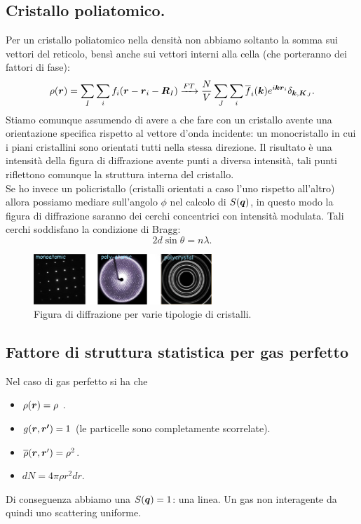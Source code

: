\subsection{Cristallo poliatomico.}
\label{subsec:Cristallo poliatomico.}
Per un cristallo poliatomico nella densità non abbiamo soltanto la somma sui vettori del reticolo, bensì anche sui vettori interni alla cella (che porteranno dei fattori di fase):
\[
	\rho (\boldsymbol{r}) 
	=
	\sum_{I}^{} \sum_{i}^{} f_i(\boldsymbol{r}-\boldsymbol{r}_i - \boldsymbol{R}_I)
	\xrightarrow[]{FT}
	\frac{N}{V} \sum_{J}^{} \sum_{i}^{} 
	\overline{f}_i(\boldsymbol{k}) e^{i \boldsymbol{k}\boldsymbol{r}_i}\delta_{\boldsymbol{k},\boldsymbol{K}_J}
.\] 
Stiamo comunque assumendo di avere a che fare con un cristallo avente una orientazione specifica rispetto al vettore d'onda incidente: un monocristallo in cui i piani cristallini sono orientati tutti nella stessa direzione. Il risultato è una intensità della figura di diffrazione avente punti a diversa intensità, tali punti riflettono comunque la struttura interna del cristallo.\\
Se ho invece un policristallo (cristalli orientati a caso l'uno rispetto all'altro) allora possiamo mediare sull'angolo $\phi$ nel calcolo di $S(\boldsymbol{q})$, in questo modo la figura di diffrazione saranno dei cerchi concentrici con intensità modulata. Tali cerchi soddisfano la condizione di Bragg:
\[
	2d\sin\theta=n\lambda
.\] 
\begin{figure}[H]
	\centering
	\includegraphics[width=0.6\textwidth]{figures/tipi-cristalli.png}
	\caption{Figura di diffrazione per varie tipologie di cristalli.}
	\label{fig:figures-tipi-cristalli-png}
\end{figure}
\subsection{Fattore di struttura statistica per gas perfetto}
\label{subsec:Fattore di struttura stati}
Nel caso di gas perfetto si ha che 
\begin{itemize}
	\item $\rho (\boldsymbol{r})= \rho $ .
	\item $g(\boldsymbol{r},\boldsymbol{r'}) = 1$ (le particelle sono completamente scorrelate).
	\item $\overline{\rho }(\boldsymbol{r},\boldsymbol{r}') = \rho ^2$.
	\item $dN = 4\pi \rho r^2 dr$.
\end{itemize}
Di conseguenza abbiamo una $S(\boldsymbol{q}) = 1$: una linea. Un gas non interagente da quindi uno scattering uniforme.

